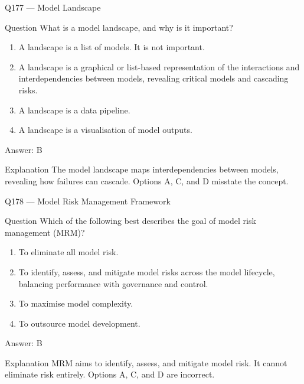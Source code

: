 \documentclass[aspectratio=169,8pt]{beamer}
\begin{document}
\begin{frame}{Q177 --- Model Landscape}
\begin{block}{Question}
What is a model landscape, and why is it important?
\begin{enumerate}
\item A landscape is a list of models. It is not important.
\item A landscape is a graphical or list-based representation of the interactions and interdependencies between models, revealing critical models and cascading risks.
\item A landscape is a data pipeline.
\item A landscape is a visualisation of model outputs.
\end{enumerate}  \end{block}
\begin{exampleblock}{Answer: B}\end{exampleblock}
\begin{block}{Explanation}
The model landscape maps interdependencies between models, revealing how failures can cascade. Options A, C, and D misstate the concept.
\end{block}
\end{frame}

\begin{frame}{Q178 --- Model Risk Management Framework}
\begin{block}{Question}
Which of the following best describes the goal of model risk management (MRM)?
\begin{enumerate}
\item To eliminate all model risk.
\item To identify, assess, and mitigate model risks across the model lifecycle, balancing performance with governance and control.
\item To maximise model complexity.
\item To outsource model development.
\end{enumerate}  \end{block}
\begin{exampleblock}{Answer: B}\end{exampleblock}
\begin{block}{Explanation}
MRM aims to identify, assess, and mitigate model risk. It cannot eliminate risk entirely. Options A, C, and D are incorrect.
\end{block}
\end{frame}
\end{document}
